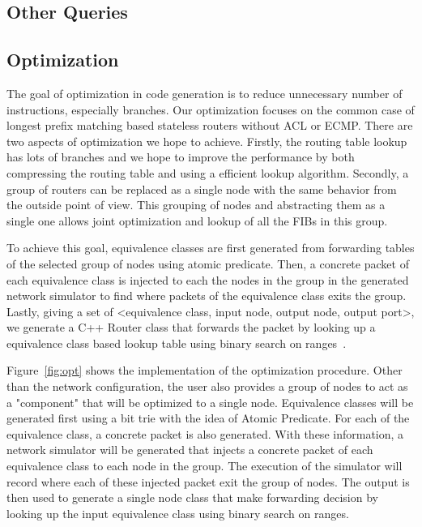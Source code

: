 \documentclass[letterpaper, 10 pt, conference]{ieeeconf}  %
\begin{document}
\subsection{Other Queries}

\subsection{Optimization}\label{sec:opt}
The goal of optimization in code generation is to reduce unnecessary number of instructions, especially branches. Our optimization focuses on the common case of longest prefix matching based stateless routers without ACL or ECMP. There are two aspects of optimization we hope to achieve. Firstly, the routing table lookup has lots of branches and we hope to improve the performance by both compressing the routing table and using a efficient lookup algorithm. Secondly, a group of routers can be replaced as a single node with the same behavior from the outside point of view. This grouping of nodes and abstracting them as a single one allows joint optimization and lookup of all the FIBs in this group.

To achieve this goal, equivalence classes are first generated from forwarding tables of the selected group of nodes using atomic predicate. Then, a concrete packet of each equivalence class is injected to each the nodes in the group in the generated network simulator to find where packets of the equivalence class exits the group. Lastly, giving a set of <equivalence class, input node, output node, output port>, we generate a C++ Router class that forwards the packet by looking up a equivalence class based lookup table using binary search on ranges~\cite{binary_search_lookup}.

Figure~\ref{fig:opt} shows the implementation of the optimization procedure. Other than the network configuration, the user also provides a group of nodes to act as a "component" that will be optimized to a single node. Equivalence classes will be generated first using a bit trie with the idea of Atomic Predicate. For each of the equivalence class, a concrete packet is also generated. With these information, a network simulator will be generated that injects a concrete packet of each equivalence class to each node in the group. The execution of the simulator will record where each of these injected packet exit the group of nodes. The output is then used to generate a single node class that make forwarding decision by looking up the input equivalence class using binary search on ranges.
\end{document}
